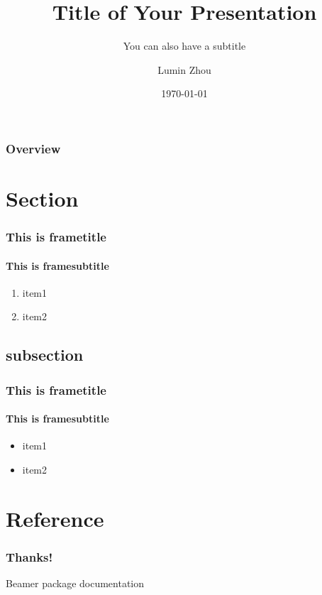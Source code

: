 \documentclass{beamer}
\title{Title of Your Presentation}
\subtitle{You can also have a subtitle}
\author{Lumin Zhou}
\institute{Example Organization}
\date{\today}
\begin{document}
\begin{frame}
 \titlepage
\end{frame}

\begin{frame}
 \frametitle{Overview}
 \tableofcontents
\end{frame}

\section{Section}

\begin{frame}
 \frametitle{This is frametitle}
 \framesubtitle{This is framesubtitle}
 \begin{enumerate}
  \item item1
  \item item2
 \end{enumerate}
\end{frame}

\subsection{subsection}

\begin{frame}
 \frametitle{This is frametitle}
 \framesubtitle{This is framesubtitle}
 \begin{itemize}
  \item item1
  \item item2
 \end{itemize}
\end{frame}

\section{Reference}

\begin{frame}
 \frametitle{Thanks!}
 \begin{thebibliography}{10}
   Beamer package documentation
 \end{thebibliography}
\end{frame}
\end{document}
